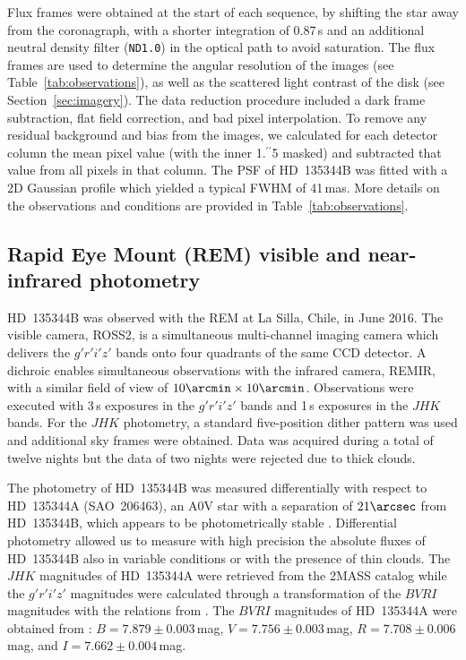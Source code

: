 \documentclass[twocolumn,tighten]{aastex61}
\newcommand{\ffarcs}{\mbox{\ensuremath{.\!\!^{\prime\prime}}}}
\begin{document}
Flux frames were obtained at the start of each sequence, by shifting the star away from the coronagraph, with a shorter integration of 0.87\,s and an additional neutral density filter (\texttt{ND1.0}) in the optical path to avoid saturation. The flux frames are used to determine the angular resolution of the images (see Table~\ref{tab:observations}), as well as the scattered light contrast of the disk (see Section~\ref{sec:imagery}). The data reduction procedure included a dark frame subtraction, flat field correction, and bad pixel interpolation. To remove any residual background and bias from the images, we calculated for each detector column the mean pixel value (with the inner 1\ffarcs5 masked) and subtracted that value from all pixels in that column. The PSF of HD~135344B was fitted with a 2D Gaussian profile which yielded a typical FWHM of 41\,mas. More details on the observations and conditions are provided in Table~\ref{tab:observations}.

\subsection{Rapid Eye Mount (REM) visible and near-infrared photometry}\label{sec:rem}

HD~135344B was observed with the REM at La Silla, Chile, in June 2016. The visible camera, ROSS2, is a simultaneous multi-channel imaging camera which delivers the $g'r'i'z'$ bands onto four quadrants of the same CCD detector. A dichroic enables simultaneous observations with the infrared camera, REMIR, with a similar field of view of $10\arcmin \times 10\arcmin$. Observations were executed with 3\,s exposures in the $g'r'i'z'$ bands and 1\,s exposures in the $JHK$ bands. For the $JHK$ photometry, a standard five-position dither pattern was used and additional sky frames were obtained. Data was acquired during a total of twelve nights but the data of two nights were rejected due to thick clouds.

The photometry of HD~135344B was measured differentially with respect to HD~135344A (SAO~206463), an A0V star with a separation of $21\arcsec$ from HD~135344B, which appears to be photometrically stable \citep{sitko2012}. Differential photometry allowed us to measure with high precision the absolute fluxes of HD~135344B also in variable conditions or with the presence of thin clouds. The $JHK$ magnitudes of HD~135344A were retrieved from the 2MASS catalog \citep{skrutskie2006} while the $g'r'i'z'$ magnitudes were calculated through a transformation of the $BVRI$ magnitudes with the relations from \citet{jordi2006}. The $BVRI$ magnitudes of HD~135344A were obtained from \citet{sitko2012}: $B=7.879\pm0.003$\,mag, $V=7.756\pm0.003$\,mag, $R=7.708\pm0.006$\,mag, and $I=7.662\pm0.004$\,mag.
\end{document}
